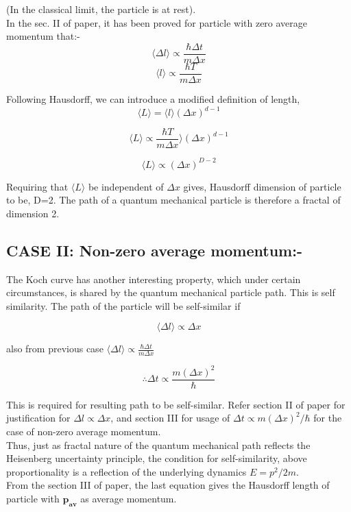 \documentclass[14pt]{extarticle}
\begin{document}
(In the classical limit, the particle is at rest).\\
In the sec. II of paper, it has been proved for particle with zero average momentum that:-
$$\langle \Delta l \rangle \propto \frac{\hbar \Delta t}{m \Delta x}$$
$$\langle  l \rangle \propto \frac{\hbar T}{m \Delta x}$$

Following Hausdorff, we can introduce a modified definition of length,\\

$$\langle  L \rangle= \langle l \rangle (\Delta x)^{d-1}$$

$$\langle  L \rangle \propto \frac{\hbar T}{m \Delta x}  \rangle (\Delta x)^{d-1}$$

$$\langle  L \rangle \propto (\Delta x)^{D-2}$$

Requiring that $\langle L \rangle$ be independent of $\Delta x$ gives, Hausdorff dimension of particle to be, D=2. The path of a quantum mechanical particle is therefore a fractal of dimension 2.

\subsection{CASE II: Non-zero average momentum:-}

The Koch curve has another interesting property, which under certain circumstances, is shared by the quantum mechanical particle path. This is self similarity. The path of the particle will be self-similar if

$$\langle \Delta l \rangle \propto \Delta x$$

also from previous case $\langle \Delta l \rangle \propto \frac{\hbar \Delta t}{m \Delta x}$

$$\therefore \Delta t \propto \frac{m (\Delta x)^2}{\hbar}$$

This is required for resulting path to be self-similar. Refer section II of paper for justification for $\Delta l \propto \Delta x$, and section III for usage of $\Delta t \propto m (\Delta x)^2 / \hbar$ for the case of non-zero average momentum.\\
Thus, just as fractal nature of the quantum mechanical path reflects the Heisenberg uncertainty principle, the condition for self-similarity, above proportionality is a reflection of the underlying dynamics $E=p^2 /2m$.\\

From the section III of paper, the last equation gives the Hausdorff length of particle with $\mathbf{p_{av}}$ as average momentum.
\end{document}
